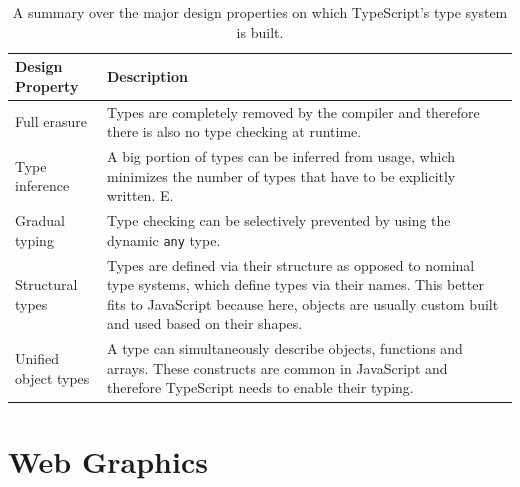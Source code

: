 \begin{table}[tp]
    \centering
    \begin{tabularx}{\linewidth}{| l | X |}
        \hline
        \textbf{Design Property} & \textbf{Description}                                                                                                                                                                                                        \\ \hline
        Full erasure             & Types are completely removed by the compiler and therefore there is also no type checking at runtime.                                                                                                                       \\ \hline
        Type inference           & A big portion of types can be inferred from usage, which minimizes the number of types that have to be explicitly written. E.                                                                                               \\ \hline
        Gradual typing           & Type checking can be selectively prevented by using the dynamic \lstinline{any} type.                                                                                                                                       \\ \hline
        Structural types         & Types are defined via their structure as opposed to nominal type systems, which define types via their names. This better fits to JavaScript because here, objects are usually custom built and used based on their shapes. \\ \hline
        Unified object types     & A type can simultaneously describe objects, functions and arrays. These constructs are common in JavaScript and therefore TypeScript needs to enable their typing.                                                          \\ \hline
    \end{tabularx}
    \caption[TypeScript Type System Design Properties]
    {
        A summary over the major design properties on which TypeScript's type system is built.
    }
    \label{tab:TSTypeSystemDesignProperties}
\end{table}


\section{Web Graphics}

